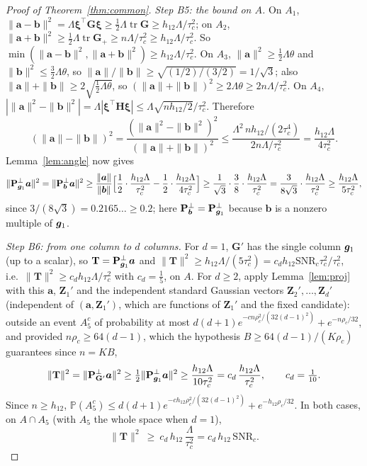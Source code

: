 \documentclass[11pt]{article}
\theoremstyle{definition}
\newcommand{\bT}{\mathbf{T}}
\newcommand{\bZ}{\mathbf{Z}}
\newcommand{\Prob}{\mathbb{P}}
\newcommand{\tr}{\operatorname{tr}}
\begin{document}
\begin{proof}[Proof of Theorem~\ref{thm:common}]
\emph{Step B5: the bound on $A$.} On $A_1$, $\|\bm a-\bm b\|^2=\Lambda\bm\xi^\top\mathbf G\bm\xi\ge\tfrac12\Lambda\tr\mathbf G\ge h_{12}\Lambda/\tau_c^2$; on $A_2$, $\|\bm a+\bm b\|^2\ge\tfrac12\Lambda\tr\mathbf G_+\ge n\Lambda/\tau_c^2\ge h_{12}\Lambda/\tau_c^2$. So $\min(\|\bm a-\bm b\|^2,\|\bm a+\bm b\|^2)\ge h_{12}\Lambda/\tau_c^2$. On $A_3$, $\|\bm a\|^2\ge\tfrac12\Lambda\theta$ and $\|\bm b\|^2\le\tfrac32\Lambda\theta$, so $\|\bm a\|/\|\bm b\|\ge\sqrt{(1/2)/(3/2)}=1/\sqrt3$; also $\|\bm a\|+\|\bm b\|\ge2\sqrt{\tfrac12\Lambda\theta}$, so $(\|\bm a\|+\|\bm b\|)^2\ge2\Lambda\theta\ge2n\Lambda/\tau_c^2$. On $A_4$, $|\|\bm a\|^2-\|\bm b\|^2|=\Lambda|\bm\xi^\top\mathbf H\bm\xi|\le\Lambda\sqrt{nh_{12}/2}/\tau_c^2$. Therefore
\[
(\|\bm a\|-\|\bm b\|)^2=\frac{(\|\bm a\|^2-\|\bm b\|^2)^2}{(\|\bm a\|+\|\bm b\|)^2}\le\frac{\Lambda^2\,nh_{12}/(2\tau_c^4)}{2n\Lambda/\tau_c^2}=\frac{h_{12}\Lambda}{4\tau_c^2}.
\]
Lemma~\ref{lem:angle} now gives
\[
\|\mathbf P^\perp_{\bm{g}_1}\bm a\|^2=\|\mathbf P^\perp_{\bm b}\bm a\|^2\ge\frac{\|\bm a\|}{\|\bm b\|}\Big[\frac12\cdot\frac{h_{12}\Lambda}{\tau_c^2}-\frac12\cdot\frac{h_{12}\Lambda}{4\tau_c^2}\Big]\ge\frac1{\sqrt3}\cdot\frac38\cdot\frac{h_{12}\Lambda}{\tau_c^2}=\frac{3}{8\sqrt3}\cdot\frac{h_{12}\Lambda}{\tau_c^2}\ge\frac{h_{12}\Lambda}{5\tau_c^2},
\]
since $3/(8\sqrt3)=0.2165\ldots\ge0.2$; here $\mathbf P^\perp_{\bm b}=\mathbf P^\perp_{\bm{g}_1}$ because $\bm b$ is a nonzero multiple of $\bm{g}_1$.

\emph{Step B6: from one column to $d$ columns.} For $d=1$, $\mathbf G'$ has the single column $\bm{g}_1$ (up to a scalar), so $\bT=\mathbf P^\perp_{\bg_1}\bm a$ and $\|\bT\|^2\ge h_{12}\Lambda/(5\tau_c^2)=c_dh_{12}\mathrm{SNR}_c\tau_c^2/\tau_c^2$, i.e.\ $\|\bT\|^2\ge c_dh_{12}\Lambda/\tau_c^2$ with $c_d=\tfrac15$, on $A$. For $d\ge2$, apply Lemma~\ref{lem:proj} with this $\bm a$, $\bZ_1'$ and the independent standard Gaussian vectors $\bZ_2',\dots,\bZ_d'$ (independent of $(\bm a,\bZ_1')$, which are functions of $\bZ_1'$ and the fixed candidate): outside an event $A_5^c$ of probability at most $d(d+1)e^{-cn\rho_c^2/(32(d-1)^2)}+e^{-n\rho_c/32}$, and provided $n\rho_c\ge64(d-1)$, which the hypothesis $B\ge64(d-1)/(K\rho_c)$ guarantees since $n=KB$,
\[
\|\bT\|^2=\|\mathbf P^\perp_{\mathbf G'}\bm a\|^2\ge\tfrac12\|\mathbf P^\perp_{\bg_1}\bm a\|^2\ge\frac{h_{12}\Lambda}{10\tau_c^2}=c_d\,\frac{h_{12}\Lambda}{\tau_c^2},\qquad c_d=\tfrac1{10}.
\]
Since $n\ge h_{12}$, $\Prob(A_5^c)\le d(d+1)e^{-ch_{12}\rho_c^2/(32(d-1)^2)}+e^{-h_{12}\rho_c/32}$. In both cases, on $A\cap A_5$ (with $A_5$ the whole space when $d=1$),
\begin{equation}\label{eq:Tbound}
\|\bT\|^2\ \ge\ c_d\,h_{12}\,\frac{\Lambda}{\tau_c^2}=c_d\,h_{12}\,\mathrm{SNR}_c .
\end{equation}




\end{proof}
\end{document}
